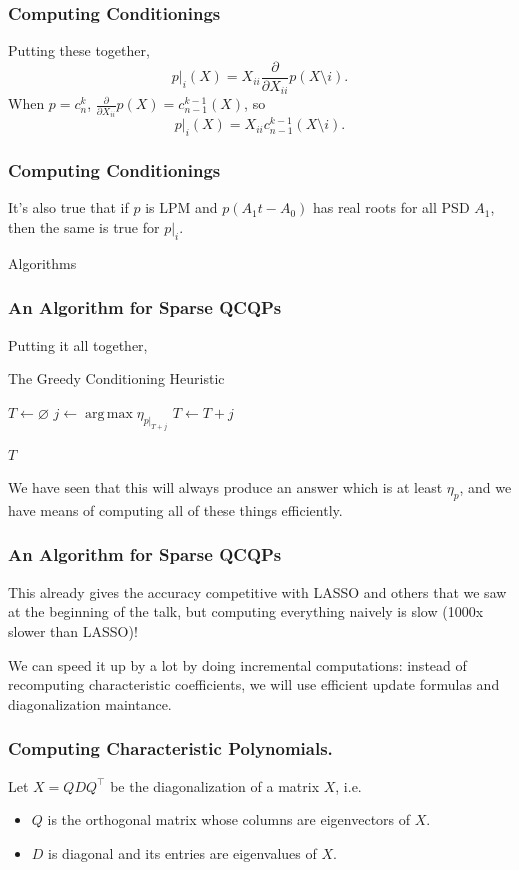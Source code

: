 \documentclass{beamer}
\DeclareMathOperator*{\argmax}{arg\,max}
\begin{document}
\begin{frame}
    \frametitle{Computing Conditionings}
    Putting these together,
    \[
        p|_i(X) = X_{ii} \frac{\partial}{\partial X_{ii}} p(X \setminus i).
    \]
    When $p = c_n^k$, $\frac{\partial}{\partial X_{ii}} p(X) = c_{n-1}^{k-1}(X)$, so 
    \[
        p|_i(X) = X_{ii} c_{n-1}^{k-1}(X \setminus i).
    \]
\end{frame}
\begin{frame}
    \frametitle{Computing Conditionings}
    It's also true that if $p$ is LPM and $p(A_1 t - A_0)$ has real roots for all PSD $A_1$, then the same is true for $p|_i$.
\end{frame}
\begin{frame}
    \centering
    \huge
    {\color{gray}Algorithms}
\end{frame}
\begin{frame}
    \frametitle{An Algorithm for Sparse QCQPs}
    Putting it all together,
    \begin{algorithm}[H]
    \caption{The Greedy Conditioning Heuristic}
    \label{alg:greedy}
    \begin{algorithmic}
        \State $T \gets \varnothing$
            \State $j \gets \argmax \eta_{p|_{T + j}}$
            \State $T \gets T + j$
        \EndFor

        \Return $T$
    \end{algorithmic}
    \end{algorithm}

    We have seen that this will always produce an answer which is at least $\eta_p$, and we have means of computing all of these things efficiently.
\end{frame}
\begin{frame}
    \frametitle{An Algorithm for Sparse QCQPs}
    This already gives the accuracy competitive with LASSO and others that we saw at the beginning of the talk, but computing everything naively is slow (1000x slower than LASSO)!

    \pause
    We can speed it up by a lot by doing incremental computations: instead of recomputing characteristic coefficients, we will use efficient update formulas and diagonalization maintance.
\end{frame}
\begin{frame}
    \frametitle{Computing Characteristic Polynomials.}
    Let $X = QDQ^{\intercal}$ be the diagonalization of a matrix $X$, i.e.
    \begin{itemize}
        \item $Q$ is the orthogonal matrix whose columns are eigenvectors of $X$.
        \item $D$ is diagonal and its entries are eigenvalues of $X$.
    \end{itemize}
\end{frame}
\end{document}

